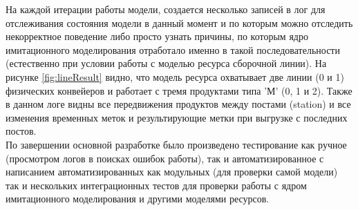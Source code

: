 \indent {}На каждой итерации работы модели, создается несколько записей в лог для отслеживания состояния модели в данный момент и по которым можно отследить некорректное поведение либо просто узнать причины, по которым ядро имитационного моделирования отработало именно в такой последовательности (естественно при условии работы с моделью ресурса сборочной линии).
На рисунке \ref{fig:lineResult} видно, что модель ресурса охватывает две линии (0 и 1) физических конвейеров и работает с тремя продуктами типа 'М' (0, 1 и 2).
Также в данном логе видны все передвижения продуктов между постами (station) и все изменения временных меток и результирующие метки при выгрузке с последних постов.\\
\indent По завершении основной разработке было произведено тестирование как ручное (просмотром логов в поисках ошибок работы), так и автоматизированное с написанием автоматизированных как модульных (для проверки самой модели) так и нескольких интеграционных тестов для проверки работы с ядром имитационного моделирования и другими моделями ресурсов.
